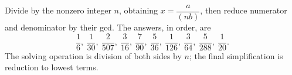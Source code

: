 Divide by the nonzero integer $n$, obtaining $x=\dfrac{a}{(nb)}$, then reduce numerator and denominator by their gcd. The answers, in order, are
\[
\boxed{\dfrac{1}{6},\ \dfrac{1}{30},\ \dfrac{2}{507},\ \dfrac{3}{16},\
\dfrac{7}{90},\ \dfrac{5}{36},\ \dfrac{1}{126},\ \dfrac{3}{64},\
\dfrac{5}{288},\ \dfrac{1}{20}}.
\]
The solving operation is division of both sides by $n$; the final simplification is reduction to lowest terms.
